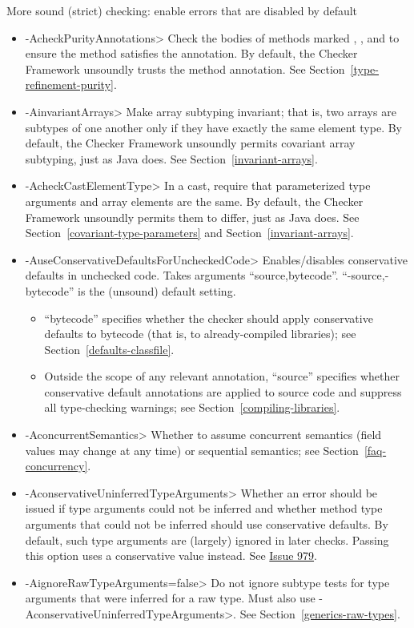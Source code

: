 \label{unsound-by-default}
More sound (strict) checking: enable errors that are disabled by default
\begin{itemize}
\item \<-AcheckPurityAnnotations>
  Check the bodies of methods marked
  ,
  ,
  and 
  to ensure the method satisfies the annotation.  By default,
  the Checker Framework unsoundly trusts the method annotation.  See
  Section~\ref{type-refinement-purity}.
\item \<-AinvariantArrays>
  Make array subtyping invariant; that is, two arrays are subtypes of one
  another only if they have exactly the same element type.  By default,
  the Checker Framework unsoundly permits covariant array subtyping, just
  as Java does.  See Section~\ref{invariant-arrays}.
\item \<-AcheckCastElementType>
  In a cast, require that parameterized type arguments and array elements
  are the same.  By default, the Checker Framework unsoundly permits them
  to differ, just as Java does.  See Section~\ref{covariant-type-parameters}
  and Section~\ref{invariant-arrays}.
\item \<-AuseConservativeDefaultsForUncheckedCode>
  Enables/disables conservative defaults in unchecked code.  Takes arguments ``source,bytecode''.
  ``-source,-bytecode'' is the (unsound) default setting.
  \begin{itemize}
  \item
  ``bytecode'' specifies
  whether the checker should apply conservative defaults to
  bytecode (that is, to already-compiled libraries); see
  Section~\ref{defaults-classfile}.
  \item
  Outside the scope of any relevant
   annotation, ``source'' specifies whether conservative
  default annotations are applied to source code and suppress all type-checking warnings; see
  Section~\ref{compiling-libraries}.
  \end{itemize}
\item \<-AconcurrentSemantics>
  Whether to assume concurrent semantics (field values may change at any
  time) or sequential semantics; see Section~\ref{faq-concurrency}.
\item \<-AconservativeUninferredTypeArguments>
  Whether an error should be issued if type arguments could not be inferred and
  whether method type arguments that could not be inferred should use
  conservative defaults.
  By default, such type arguments are (largely) ignored in later
  checks.
  Passing this option uses a conservative value instead.
  See \href{https://github.com/typetools/checker-framework/issues/979}{Issue
  979}.
\item \<-AignoreRawTypeArguments=false>
  Do not ignore subtype tests for type arguments that were inferred for a
  raw type. Must also use \<-AconservativeUninferredTypeArguments>.  See
  Section~\ref{generics-raw-types}.
\end{itemize}

